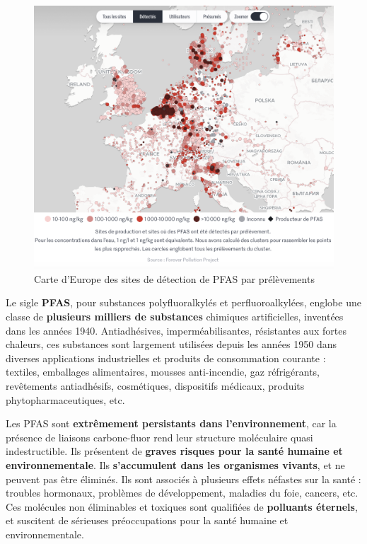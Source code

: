 \documentclass[a4paper,twoside,12pt]{book}
\begin{document}
\begin{figure}[!h]
\centering 
\includegraphics[width=1\textwidth]{img/intro/FPP_Carte_Clusters_SitesPFAS_Detectes.png}
\caption{Carte d'Europe des sites de détection de PFAS par prélèvements}
\label{fig:Carte_PFAS_LeMonde}
\end{figure}



\begin{tcolorbox}[colback=gray!5!white,colframe=gray!20!white]
Le sigle \textbf{PFAS}, pour substances polyfluoralkylés et perfluoroalkylées, englobe une classe de \textbf{plusieurs milliers de substances} chimiques artificielles, inventées dans les années 1940. Antiadhésives, imperméabilisantes, résistantes aux fortes chaleurs, ces substances sont largement utilisées depuis les années 1950 dans diverses applications industrielles et produits de consommation courante : textiles, emballages alimentaires, mousses anti-incendie, gaz réfrigérants, revêtements antiadhésifs, cosmétiques, dispositifs médicaux, produits phytopharmaceutiques, etc. 

Les PFAS sont \textbf{extrêmement persistants dans l'environnement}, car la présence de liaisons carbone-fluor rend leur structure moléculaire quasi indestructible. Ils présentent de \textbf{graves risques pour la santé humaine et environnementale}. Ils \textbf{s'accumulent dans les organismes vivants}, et ne peuvent pas être éliminés. Ils sont associés à plusieurs effets néfastes sur la santé : troubles hormonaux, problèmes de développement, maladies du foie, cancers, etc. Ces molécules non éliminables et toxiques sont qualifiées de \textbf{polluants éternels}, et suscitent de sérieuses préoccupations pour la santé humaine et environnementale.
\end{tcolorbox}
\end{document}

